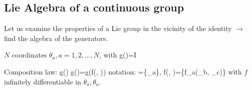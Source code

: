\documentclass[12pt]{article}
\begin{document}
\subsection{Lie Algebra of a continuous group}

Let us examine the properties of a Lie group in the
vicinity of the identity \(\rightarrow\) find the algebra of the generators.


\(N\) coordinates \(\theta_{a}, a=1,2, \ldots, N\), with
\be
g()=I
\ee

Composition law:
\be
g(\overline{\theta}) g(\theta)=g(f(\overline{\theta}, \theta))
\label{eq:t:composition}
\ee
notation:
\be
\theta=\{\theta_{a}\}, f(\overline\theta, \theta)=\{f_{a}(\theta_{b}, \theta_{c})\}
\ee
with $f$ infinitely differentiable in $\overline{\theta}_a,\theta_a$.
\end{document}
